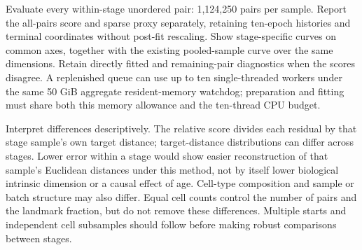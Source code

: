 Evaluate every within-stage unordered pair: 1,124,250 pairs per sample.
Report the all-pairs score and sparse proxy separately, retaining
ten-epoch histories and terminal coordinates without post-fit rescaling.
Show stage-specific curves on common axes, together with the existing
pooled-sample curve over the same dimensions. Retain directly fitted and
remaining-pair diagnostics when the scores disagree. A replenished queue
can use up to ten single-threaded workers under the same 50 GiB aggregate
resident-memory watchdog; preparation and fitting must share both this
memory allowance and the ten-thread CPU budget.

Interpret differences descriptively. The relative score divides each
residual by that stage sample's own target distance; target-distance
distributions can differ across stages. Lower error within a stage would
show easier reconstruction of that sample's Euclidean distances under
this method, not by itself lower biological intrinsic dimension or a
causal effect of age. Cell-type composition and sample or batch structure
may also differ. Equal cell counts control the number of pairs and the
landmark fraction, but do not remove these differences. Multiple starts
and independent cell subsamples should follow before making robust
comparisons between stages.
\FloatBarrier
